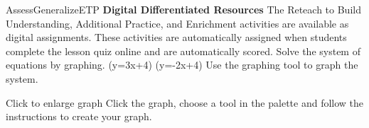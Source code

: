 \documentclass{article}
\newenvironment{te-addendum}[2]{}{}     %
\newcommand{\placeholder}[2]{}          %
\newcommand{\te}[1]{}                   %
\begin{document}
\begin{te-addendum}{Assess}{GeneralizeETP}
\textbf{Digital Differentiated Resources}
The Reteach to Build Understanding, Additional Practice, and Enrichment activities are available as digital assignments. These activities are automatically assigned when students complete the lesson quiz online and are automatically scored.
Solve the system of equations by graphing.
(y=3x+4)
(y=-2x+4)
Use the graphing tool to graph the system.
\placeholder{graph}{Digital practice tablet with empty coordinate grid, x and y axes spanning -10 to 10 at unit intervals, labeled every 2 units, upper-right grid partly covered by Question Help menu. Small Click to enlarge graph icon at left shows two intersecting lines. No lines plotted on the main grid.}
Click to enlarge graph
Click the graph, choose a tool in the palette and follow the instructions to create your graph.
\te{Exit. Question Help. Help Me Solve This. View an Example. Video. Textbook. Glossary. Math Tools. Print. 1 part remaining. Clear All. Check Answer. Review progress. Question 5 of 14. Go. Back. Next. Printed digital example is a linear system, not a quadratic-formula exercise.}
\end{te-addendum}
\end{document}
